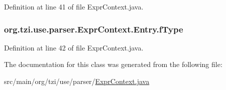 Definition at line 41 of file Expr\-Context.\-java.

\hypertarget{classorg_1_1tzi_1_1use_1_1parser_1_1_expr_context_1_1_entry_a24ad863d12be018375d7c9dc6f00c3a9}{
\subsubsection[{f\-Type}]{ org.\-tzi.\-use.\-parser.\-Expr\-Context.\-Entry.\-f\-Type}}\label{classorg_1_1tzi_1_1use_1_1parser_1_1_expr_context_1_1_entry_a24ad863d12be018375d7c9dc6f00c3a9}


Definition at line 42 of file Expr\-Context.\-java.



The documentation for this class was generated from the following file\-:\begin{DoxyCompactItemize}
\item 
src/main/org/tzi/use/parser/\hyperlink{_expr_context_8java}{Expr\-Context.\-java}\end{DoxyCompactItemize}
